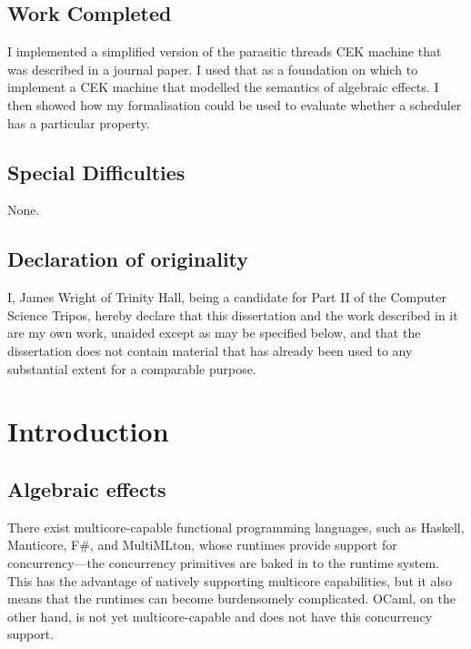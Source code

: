 \documentclass[12pt,a4paper,twoside,openright]{report}
\begin{document}
\section*{Work Completed}
I implemented a simplified version of the parasitic threads CEK machine that was described in a journal paper. I used that as a foundation on which to implement a CEK machine that modelled the semantics of algebraic effects. I then showed how my formalisation could be used to evaluate whether a scheduler has a particular property.
\section*{Special Difficulties}

None.
 
\cleardoublepage
\section*{Declaration of originality}

I, James Wright of Trinity Hall, being a candidate for Part II of the Computer
Science Tripos, hereby declare
that this dissertation and the work described in it are my own work,
unaided except as may be specified below, and that the dissertation
does not contain material that has already been used to any substantial
extent for a comparable purpose.

\bigskip
{}

\vspace{2.5cm}

\tableofcontents

\listoffigures


\pagestyle{headings}

\chapter{Introduction}

\section{Algebraic effects}

There exist multicore-capable functional programming languages, such as Haskell\cite{Marlow2009}, Manticore\cite{Fluet2010}, F\#\cite{Syme2011}, and MultiMLton\cite{Siv2014}, whose runtimes provide support for concurrency---the concurrency primitives are baked in to the runtime system. This has the advantage of natively supporting multicore capabilities, but it also means that the runtimes can become burdensomely complicated. OCaml, on the other hand, is not yet multicore-capable and does not have this concurrency support.
\end{document}
